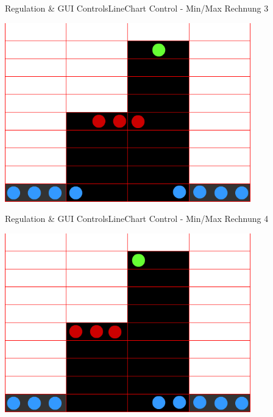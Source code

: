 	\begin{frame}{Regulation \& GUI Controls}{LineChart Control - Min/Max Rechnung 3}
	\begin{center}			
		\includegraphics[width=0.8\textwidth]{../regulation/TooManySamples030003.png}
	\end{center}
	\end{frame}
	
	\begin{frame}{Regulation \& GUI Controls}{LineChart Control - Min/Max Rechnung 4}
	\begin{center}			
		\includegraphics[width=0.8\textwidth]{../regulation/TooManySamples030004.png}
	\end{center}
	\end{frame}
	
